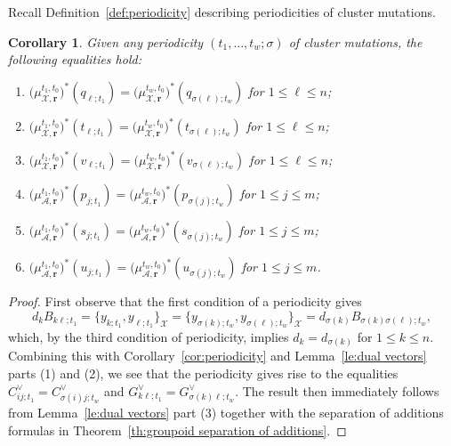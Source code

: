 \documentclass{amsart}
\newtheorem{corollary}[theorem]{Corollary}
\numberwithin{equation}{section}
\newcommand{\bfr}{{\boldsymbol{r}}}
\newcommand{\cA}{\mathcal{A}}
\newcommand{\cX}{\mathcal{X}}
\begin{document}
Recall Definition~\ref{def:periodicity} describing periodicities of cluster mutations.
\begin{corollary}
  Given any periodicity $(t_1,\ldots,t_w;\sigma)$ of cluster mutations, the following equalities hold:
  \begin{enumerate}
    \item $\big(\mu_{\cX,\bfr}^{t_1,t_0}\big)^*(q_{\ell;t_1})=\big(\mu_{\cX,\bfr}^{t_w,t_0}\big)^*(q_{\sigma(\ell);t_w})$ for $1\le\ell\le n$;
    \item $\big(\mu_{\cX,\bfr}^{t_1,t_0}\big)^*(t_{\ell;t_1})=\big(\mu_{\cX,\bfr}^{t_w,t_0}\big)^*(t_{\sigma(\ell);t_w})$ for $1\le\ell\le n$;
    \item $\big(\mu_{\cX,\bfr}^{t_1,t_0}\big)^*(v_{\ell;t_1})=\big(\mu_{\cX,\bfr}^{t_w,t_0}\big)^*(v_{\sigma(\ell);t_w})$ for $1\le\ell\le n$;
    \item $\big(\mu_{\cA,\bfr}^{t_1,t_0}\big)^*(p_{j;t_1})=\big(\mu_{\cA,\bfr}^{t_w,t_0}\big)^*(p_{\sigma(j);t_w})$ for $1\le j\le m$;
    \item $\big(\mu_{\cA,\bfr}^{t_1,t_0}\big)^*(s_{j;t_1})=\big(\mu_{\cA,\bfr}^{t_w,t_0}\big)^*(s_{\sigma(j);t_w})$ for $1\le j\le m$;
    \item $\big(\mu_{\cA,\bfr}^{t_1,t_0}\big)^*(u_{j;t_1})=\big(\mu_{\cA,\bfr}^{t_w,t_0}\big)^*(u_{\sigma(j);t_w})$ for $1\le j\le m$.
  \end{enumerate}
\end{corollary}
\begin{proof}
  First observe that the first condition of a periodicity gives 
  \[d_k B_{k\ell;t_1}=\{y_{k;t_1},y_{\ell;t_1}\}_\cX=\{y_{\sigma(k);t_w},y_{\sigma(\ell);t_w}\}_\cX=d_{\sigma(k)} B_{\sigma(k)\sigma(\ell);t_w},\]
  which, by the third condition of periodicity, implies $d_k=d_{\sigma(k)}$ for $1\le k\le n$.
  Combining this with Corollary~\ref{cor:periodicity} and Lemma~\ref{le:dual vectors} parts (1) and (2), we see that the periodicity gives rise to the equalities $C^\vee_{ij;t_1}=C^\vee_{\sigma(i)j;t_w}$ and $G^\vee_{k\ell;t_1}=G^\vee_{\sigma(k)\ell;t_w}$.
  The result then immediately follows from Lemma~\ref{le:dual vectors} part (3) together with the separation of additions formulas in Theorem~\ref{th:groupoid separation of additions}.
\end{proof}
\end{document}
